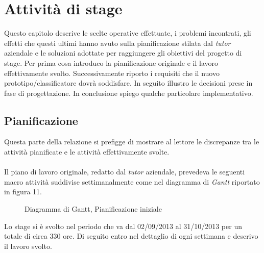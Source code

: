 \newpage

\section{Attività di stage}
\label{3.0}
Questo capitolo descrive le scelte operative effettuate, i problemi incontrati, gli effetti che questi ultimi hanno avuto sulla pianificazione stilata dal \emph{tutor} aziendale e le soluzioni adottate per raggiungere gli obiettivi del progetto di stage. Per prima cosa introduco la pianificazione originale e il lavoro effettivamente svolto. Successivamente riporto i requisiti che il nuovo prototipo/classificatore dovrà soddisfare. In seguito illustro le decisioni prese in fase di progettazione. In conclusione spiego qualche particolare implementativo.
\subsection{Pianificazione}
\label{3.1}
Questa parte della relazione si prefigge di mostrare al lettore le discrepanze tra le attività pianificate e le attività effettivamente svolte.\\\\
Il piano di lavoro originale, redatto dal \emph{tutor} aziendale, prevedeva le seguenti macro attività suddivise settimanalmente come nel diagramma di \emph{Gantt} riportato in figura 11.
\begin{figure}[H]
\centering
\noindent{}
\caption{Diagramma di Gantt, Pianificazione iniziale}
\end{figure}
Lo stage si è svolto nel periodo che va dal 02/09/2013 al 31/10/2013 per un totale di circa 330 ore.
Di seguito entro nel dettaglio di ogni settimana e descrivo il lavoro svolto.
